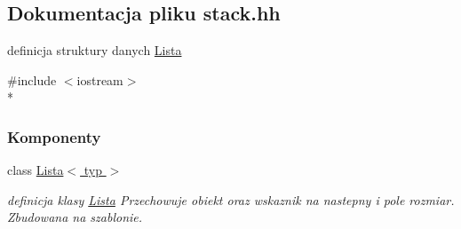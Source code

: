 \hypertarget{stack_8hh}{}\subsection{Dokumentacja pliku stack.\+hh}
\label{stack_8hh}


definicja struktury danych \hyperlink{class_lista}{Lista}  


{\ttfamily \#include $<$iostream$>$}\\*
\subsubsection*{Komponenty}
\begin{DoxyCompactItemize}
\item 
class \hyperlink{class_lista}{Lista$<$ typ $>$}
\begin{DoxyCompactList}\small\item\em definicja klasy \hyperlink{class_lista}{Lista} Przechowuje obiekt oraz wskaznik na nastepny i pole rozmiar. Zbudowana na szablonie. \end{DoxyCompactList}\end{DoxyCompactItemize}
